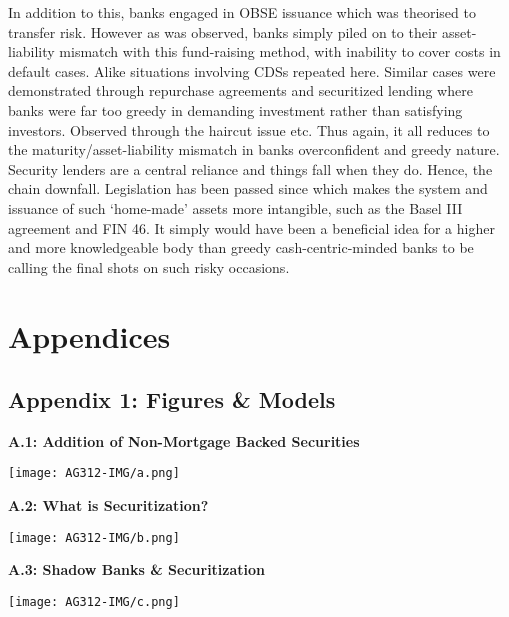 \documentclass[11pt, english]{article}
\begin{document}
	In addition to this, banks engaged in OBSE issuance which was theorised to transfer risk. However as was observed, banks simply piled on to their asset-liability mismatch with this fund-raising method, with inability to cover costs in default cases. Alike situations involving CDSs repeated here. Similar cases were demonstrated through repurchase agreements and securitized lending where banks were far too greedy in demanding investment rather than satisfying investors. Observed through the haircut issue etc. Thus again, it all reduces to the maturity/asset-liability mismatch in banks overconfident and greedy nature. Security lenders are a central reliance and things fall when they do. Hence, the chain downfall. Legislation has been passed since which makes the system and issuance of such `home-made' assets more intangible, such as the Basel III agreement and FIN 46. It simply would have been a beneficial idea for a higher and more knowledgeable body than greedy cash-centric-minded banks to be calling the final shots on such risky occasions.

\newpage

\section*{Appendices}

	\subsection*{Appendix 1: Figures \& Models}

	\textbf{A.1: Addition of Non-Mortgage Backed Securities}

	\begin{center}
		\texttt{[image: AG312-IMG/a.png]}
	\end{center}

	\textbf{A.2: What is Securitization?}

        \begin{center}
                \texttt{[image: AG312-IMG/b.png]}
        \end{center}

	\textbf{A.3: Shadow Banks \& Securitization}

        \begin{center}
                \texttt{[image: AG312-IMG/c.png]}
        \end{center}

\newpage
\end{document}

